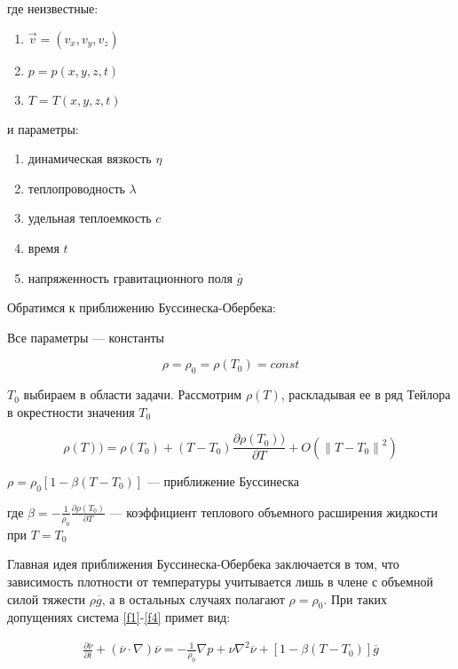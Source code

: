 \documentclass[14pt, a4paper]{article}
\begin{document}
где неизвестные:

\begin{enumerate}
\item $ \vec v = (v_x, v_y, v_z)$
\item $ p = p(x,y,z,t)$
\item $ T = T(x,y,z,t)$
\end{enumerate}

и параметры:

\begin{enumerate}
\item динамическая вязкость $\eta$
\item теплопроводность $\lambda$
\item удельная теплоемкость $c$
\item время $t$
\item напряженность гравитационного поля $\overline g$ 
\end{enumerate}

Обратимся к приближению Буссинеска-Обербека:

Все параметры --- константы

$$ \rho = \rho_0 = \rho (T_0) = const $$

$T_0$ выбираем в области задачи. Рассмотрим $\rho(T)$, раскладывая ее в ряд Тейлора в окрестности значения $T_0$

$$\rho (T)) = \rho(T_0) + (T - T_0) \frac{\partial \rho(T_0))}{\partial T} + O(\left\lVert T - T_0 \right\rVert ^ 2)$$

$\rho = \rho_0[1 - \beta(T - T_0)]$ --- приближение Буссинеска

где $\beta = - \frac{1}{\rho_0} \frac{\partial \rho(T_0)}{\partial T}$ --- коэффициент теплового объемного расширения жидкости при $T=T_0$

Главная идея приближения Буссинеска-Обербека заключается в том, что зависимость плотности от температуры учитывается лишь в члене с объемной силой тяжести $\rho \overline g$, а в остальных случаях полагают $\rho = \rho_0$. При таких допущениях система \eqref{f1}-\eqref{f4} примет вид:

\begin{equation}
\begin{gathered}
\label{f5}
\frac{\partial \overline \nu}{\partial t} + (\overline \nu \cdot \nabla)\overline \nu = -\frac{1}{\rho_0}\nabla p + \nu \nabla^2 \overline \nu + [1-\beta(T-T_0)]\overline g
\end{gathered}
\end{equation}
\end{document}
